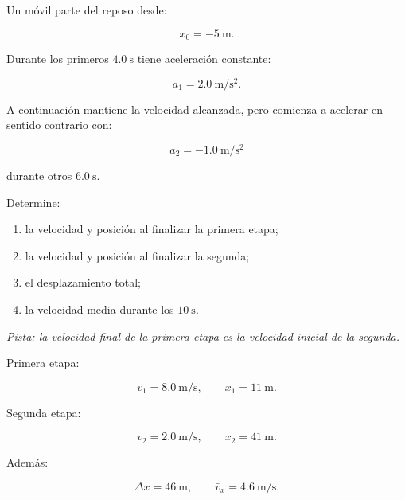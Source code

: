 \begin{ejercicio}
Un móvil parte del reposo desde:

\[ x_0=-\SI{5}{\meter}. \]

Durante los primeros \(\SI{4.0}{\second}\) tiene aceleración constante:

\[ a_1=\SI{2.0}{\meter\per\second\squared}. \]

A continuación mantiene la velocidad alcanzada, pero comienza a acelerar en sentido contrario con:

\[ a_2=-\SI{1.0}{\meter\per\second\squared} \]

durante otros \(\SI{6.0}{\second}\).

Determine:

\begin{enumerate}[label=\alph*)]
    \item la velocidad y posición al finalizar la primera etapa;
    \item la velocidad y posición al finalizar la segunda;
    \item el desplazamiento total;
    \item la velocidad media durante los \(\SI{10}{\second}\).
\end{enumerate}

\textit{Pista: la velocidad final de la primera etapa es la velocidad inicial de la segunda.}
\end{ejercicio}

\begin{respuesta}
Primera etapa:

\[
v_1=\SI{8.0}{\meter\per\second},
\qquad
x_1=\SI{11}{\meter}.
\]

Segunda etapa:

\[
v_2=\SI{2.0}{\meter\per\second},
\qquad
x_2=\SI{41}{\meter}.
\]

Además:

\[
\Delta x=\SI{46}{\meter},
\qquad
\bar{v}_x=\SI{4.6}{\meter\per\second}.
\]
\end{respuesta}

